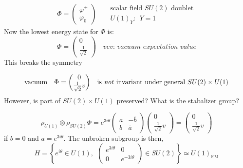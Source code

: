 \begin{equation}
\begin{matrix}
    \Phi = \begin{pmatrix}
        \varphi^+\\
        \varphi_0
    \end{pmatrix} & &
    \begin{matrix}
        \text{scalar field $SU(2)$ doublet}\\
        U(1)_Y: \ \ Y=1
    \end{matrix}
\end{matrix}
\end{equation}
Now the lowest energy state for $\Phi$ is:
\begin{equation}
    \Phi = \begin{pmatrix}
        0\\
        \frac{1}{\sqrt{2}}
    \end{pmatrix} \ \ \ \textit{ vev: vacuum expectation value} 
\end{equation}
This breaks the symmetry

\begin{equation}
\begin{matrix}
    \text{vacuum} & \Phi = \begin{pmatrix}
        0\\ \frac{1}{\sqrt{2}}v
    \end{pmatrix} & \text{is \textit{not} invariant under general $SU(2)\times U(1)$}
\end{matrix}
\end{equation}
However, is part of $SU(2)\times U(1)$ preserved? What is the stabalizer group?

\begin{equation}
    \rho_{U(1)}\otimes\rho_{SU(2)}\Phi = e^{3i\theta}\begin{pmatrix}
        a & -\overline{b}\\
        b & \overline{a}
    \end{pmatrix}\begin{pmatrix}
        0\\ \frac{1}{\sqrt{2}}v
    \end{pmatrix} = \begin{pmatrix}
        0\\ \frac{1}{\sqrt{2}}v
    \end{pmatrix} 
\end{equation}
 if $b=0$ and $a = e^{3i\theta}$. The unbroken subgroup is then, 
 \begin{equation}
     H = \left\{e^{i\theta}\in U(1),\ \ \begin{pmatrix}
         e^{3i\theta}&0\\
         0&e^{-3i\theta} \end{pmatrix}
         \in SU(2) \right\}\simeq{}U(1)_{\text{EM}}
 \end{equation}